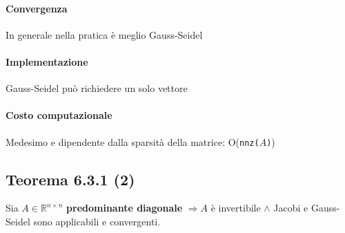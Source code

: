 \documentclass[10pt]{book}
\begin{document}
\paragraph{Convergenza} In generale nella pratica è meglio Gauss-Seidel
\paragraph{Implementazione} Gauss-Seidel può richiedere un solo vettore
\paragraph{Costo computazionale} Medesimo e dipendente dalla sparsità della matrice: O(\texttt{nnz(}$A$\texttt{)})
\subsection{Teorema 6.3.1 (2)} Sia $A \in \mathbb{R}^{n \times n}$ \textbf{predominante diagonale} $\Rightarrow A$ è invertibile $\wedge$ Jacobi e Gauss-Seidel sono applicabili e convergenti.
\end{document}
